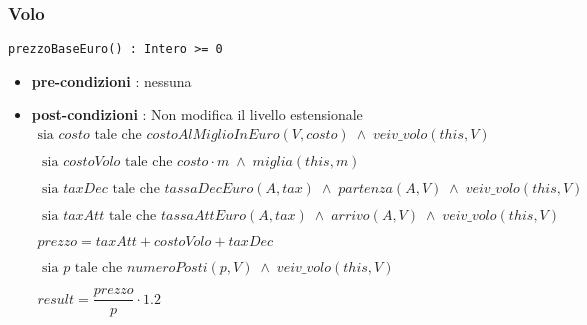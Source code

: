 \documentclass[12pt, letterpaper]{article}
\newcommand{\code}[1]{\colorbox{light-gray}{\texttt{#1}}}
\begin{document}
\subsubsection{Volo}
\code{prezzoBaseEuro() : Intero >= 0}\begin{itemize}
    \item \textbf{pre-condizioni} : nessuna 
    \item \textbf{post-condizioni} : Non modifica il livello estensionale$$\begin{matrix}
        \text{sia }costo \text{ tale che }costoAlMiglioInEuro(V,costo) \;\land\; veiv\_volo(this,V)\\ \\ 
        \text{ sia }costoVolo \text{ tale che } costo\cdot m \;\land\; miglia(this,m)\\ \\ 
        \text{ sia }taxDec \text{ tale che } tassaDecEuro(A,tax)\;\land\; partenza(A,V) \;\land\; veiv\_volo(this,V)\\ \\ 
        \text{ sia }taxAtt \text{ tale che } tassaAttEuro(A,tax)\;\land\; arrivo(A,V) \;\land\; veiv\_volo(this,V)\\ \\ 
        prezzo = taxAtt + costoVolo + taxDec\\ \\ 
        \text{ sia }p \text{ tale che } numeroPosti(p,V)\;\land\; veiv\_volo(this,V)\\ \\ 
        result = \dfrac{prezzo}{p}\cdot 1.2
    \end{matrix} $$
\end{itemize}
\newpage 
\end{document}
